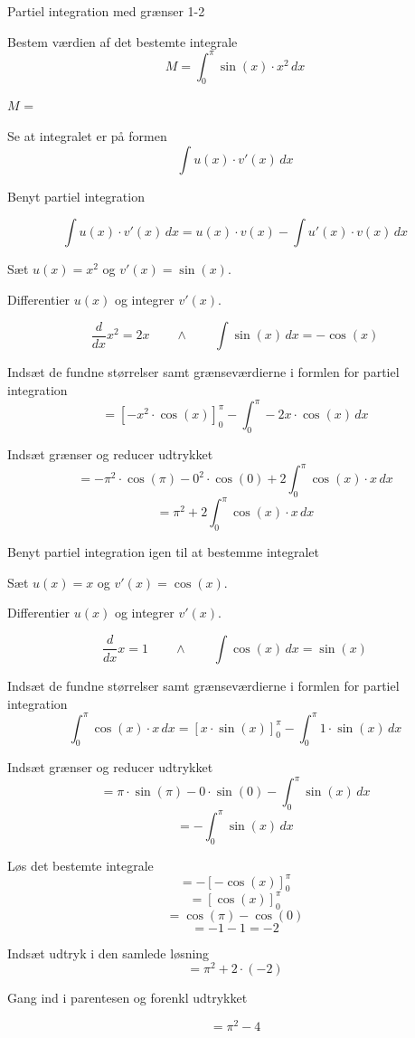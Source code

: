 \documentclass{article}
\begin{document}
\begin{exercise}{Partiel integration med grænser 1-2}


Bestem værdien af det bestemte integrale
\[
M = \int_0^\pi \sin(x) \cdot x^2 \, dx
\]

$M$ = 


\hint

Se at integralet er på formen
\[
\int u(x) \cdot v'(x) \, dx
\]

\hint

Benyt partiel integration

\hint
\[
\int u(x) \cdot v'(x)\, dx = u(x) \cdot v(x) - \int u'(x) \cdot v(x) \, dx
\]

\hint

Sæt $u(x) = x^2$ og $v'(x) = \sin(x)$.


\hint

Differentier $u(x)$ og integrer $v'(x)$.

\hint
\[
\frac{d}{dx}x^2 = 2x \qquad \wedge \qquad \int \sin(x) \, dx = - \cos(x)
\]

\hint

Indsæt de fundne størrelser samt grænseværdierne i formlen for partiel integration
\[
= \left[-x^2 \cdot \cos(x) \right]_{0}^{\pi} - \int_{0}^{\pi} -2x \cdot \cos(x) \, dx
\]

\hint

Indsæt grænser og reducer udtrykket
\[
= - \pi^2 \cdot \cos(\pi) - 0^2 \cdot \cos(0) + 2 \int_{0}^{\pi} \cos(x) \cdot x \, dx
\]
\[
= \pi^2 + 2 \int_{0}^{\pi} \cos(x) \cdot x \, dx
\]

\hint
Benyt partiel integration igen til at bestemme integralet


\hint

Sæt $u(x) = x$ og $v'(x) = \cos(x)$.


\hint

Differentier $u(x)$ og integrer $v'(x)$.

\hint
\[
\frac{d}{dx}x = 1 \qquad \wedge \qquad \int \cos(x) \, dx = \sin(x)
\]

\hint

Indsæt de fundne størrelser samt grænseværdierne i formlen for partiel integration
\[
\int_{0}^{\pi} \cos(x) \cdot x \, dx = \left[ x \cdot \sin(x) \right]_0^\pi - \int_0^\pi 1 \cdot \sin(x) \, dx
\]

\hint

Indsæt grænser og reducer udtrykket
\[
= \pi \cdot \sin(\pi) - 0 \cdot \sin(0) - \int_0^\pi \sin(x) \,dx
\]
\[
= - \int_0^\pi \sin(x) \, dx
\]

\hint

Løs det bestemte integrale
\[
= - \left[ - \cos(x) \right]_0^\pi
\]
\[
= \left[ \cos(x) \right]_0^\pi
\]
\[
= \cos(\pi) - \cos(0)
\]
\[
= -1 - 1 = -2
\]



\hint
Indsæt udtryk i den samlede løsning
\[
= \pi^2 + 2 \cdot (-2 )
\]

\hint
Gang ind i parentesen og forenkl udtrykket

\hint
\[
= \pi ^2 - 4
\]



\end{exercise}
\end{document}

